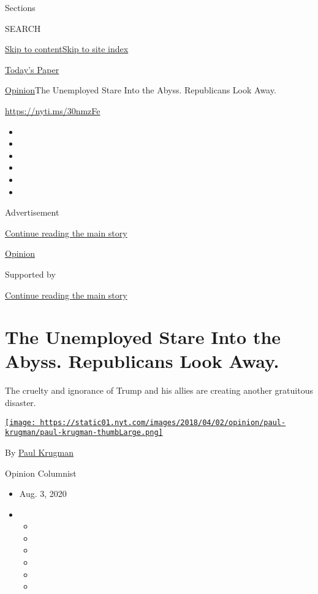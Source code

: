 Sections

SEARCH

\protect\hyperlink{site-content}{Skip to
content}\protect\hyperlink{site-index}{Skip to site index}

\href{https://myaccount.nytimes.com/auth/login?response_type=cookie\&client_id=vi}{}

\href{https://www.nytimes.com/section/todayspaper}{Today's Paper}

\href{/section/opinion}{Opinion}\textbar{}The Unemployed Stare Into the
Abyss. Republicans Look Away.

\href{https://nyti.ms/30nmzFe}{https://nyti.ms/30nmzFe}

\begin{itemize}
\item
\item
\item
\item
\item
\item
\end{itemize}

Advertisement

\protect\hyperlink{after-top}{Continue reading the main story}

\href{/section/opinion}{Opinion}

Supported by

\protect\hyperlink{after-sponsor}{Continue reading the main story}

\hypertarget{the-unemployed-stare-into-the-abyss-republicans-look-away}{%
\section{The Unemployed Stare Into the Abyss. Republicans Look
Away.}\label{the-unemployed-stare-into-the-abyss-republicans-look-away}}

The cruelty and ignorance of Trump and his allies are creating another
gratuitous disaster.

\href{https://www.nytimes.com/by/paul-krugman}{\texttt{[image: https://static01.nyt.com/images/2018/04/02/opinion/paul-krugman/paul-krugman-thumbLarge.png]}}

By \href{https://www.nytimes.com/by/paul-krugman}{Paul Krugman}

Opinion Columnist

\begin{itemize}
\item
  Aug. 3, 2020
\item
  \begin{itemize}
  \item
  \item
  \item
  \item
  \item
  \item
  \end{itemize}
\end{itemize}

